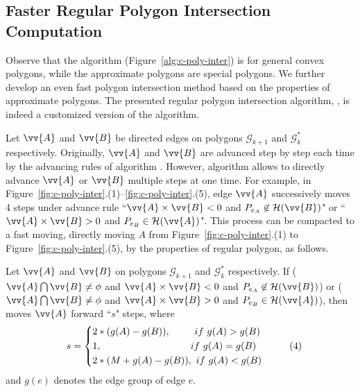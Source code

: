 



\subsection{Faster Regular Polygon Intersection Computation}


Observe that the \cpia algorithm (Figure~\ref{alg:c-poly-inter}) is for general convex polygons, while the approximate polygons are special polygons. We further develop an even fast polygon intersection method based on the properties of approximate polygons.
%
The presented regular polygon intersection algorithm, \ie \rpia, is indeed a customized version of the \cpia algorithm.

Let $\vv{A}$ and $\vv{B}$ be directed edges on polygons $\mathcal{G}_{k+1}$ and $\mathcal{G}^*_k$ respectively.
Originally, $\vv{A}$ and $\vv{B}$ are advanced step by step each time by the advancing rules of algorithm \cpia .
However, algorithm \rpia allows to directly advance $\vv{A}$ or $\vv{B}$ multiple steps at one time.
%
For example, in Figure~\ref{fig:c-poly-inter}.(1)--\ref{fig:c-poly-inter}.(5), edge $\vv{A}$ successively moves 4 steps under advance rule ``$\vv{A} \times \vv{B} < 0$ and $P_{e_A} \not \in \mathcal{H}(\vv{B})$" or ``$\vv{A} \times \vv{B} > 0$ and $P_{e_B} \in \mathcal{H}(\vv{A})$".
This process can be compacted to a fast moving, \ie directly moving $A$ from Figure~\ref{fig:c-poly-inter}.(1) to Figure~\ref{fig:c-poly-inter}.(5), by the properties of regular polygon, as follows.



\vspace{1ex}
\begin{theorem}
\label{prop-rule1}
Let $\vv{A}$ and $\vv{B}$ on polygons $\mathcal{G}_{k+1}$ and $\mathcal{G}^*_k$ respectively.
If ($\vv{A} \bigcap \vv{B} \ne \phi$ and $\vv{A} \times \vv{B} < 0$ and $P_{e_A} \not \in \mathcal{H}(\vv{B})$) or ($\vv{A} \bigcap \vv{B} \ne \phi$ and $\vv{A} \times \vv{B} > 0$ and $P_{e_B} \in \mathcal{H}(\vv{A})$), then moves $\vv{A}$ forward ``$s$" steps, where
\begin{equation*}
\label{equ-rule1}
\small
    \hspace{2ex} s =  \left\{
    \begin{aligned}
        & 2*(g(A) - g(B)),  \hspace{5ex} ~if  ~g(A) > g(B) \\
        & {1},              \hspace{20.5ex}~if  ~g(A) = g(B) \\
        & 2*(M+g(A) - g(B)), ~if  ~g(A) < g(B) \\
    \end{aligned}
    \right.       \hspace{6ex}(4)
\end{equation*}
and $g(e)$ denotes the edge group of edge $e$.
\end{theorem}



